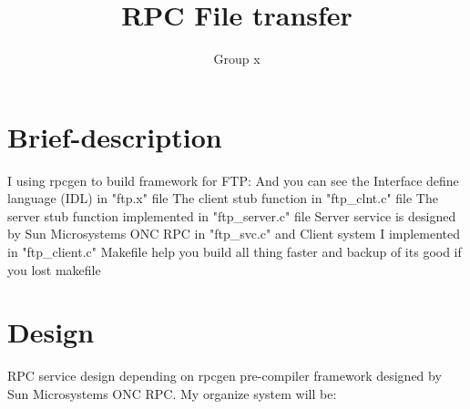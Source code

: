 \documentclass{article}
\title{RPC File transfer}
\author{Group x}
\begin{document}
\maketitle
\section{Brief-description}
I using rpcgen to build framework for FTP:
And you can see the Interface define language (IDL) in "ftp.x" file \newline
The client stub function in "ftp_clnt.c" file \newline
The server stub function implemented in "ftp_server.c" file \newline
Server service is designed by Sun Microsystems ONC RPC in "ftp_svc.c" and Client system I implemented in "ftp_client.c" \newline
Makefile help you build all thing faster and backup of its good if you lost makefile \newline

\section{Design}
RPC service design depending on rpcgen pre-compiler framework designed by Sun Microsystems ONC RPC. \newline
My organize system will be: \newline
\end{document}
